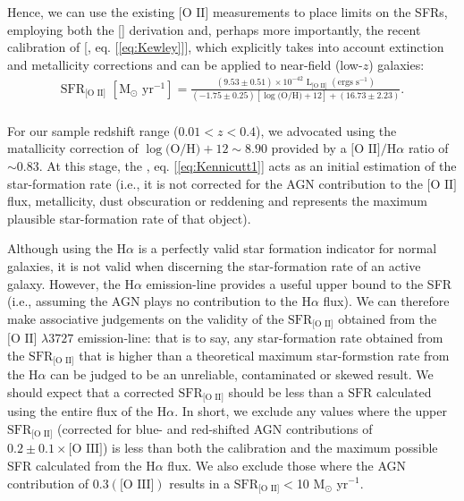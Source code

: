 Hence, we can use the existing $\text{[O II]}$ measurements to place limits on the SFRs, employing both the [\cite{Kennicutt_1998}] derivation and, perhaps more importantly, the recent calibration of [\cite{Kewley_2004}, eq. [\ref{eq:Kewley}]], which explicitly takes into account extinction and metallicity corrections and can be applied to near-field (low-$z$) galaxies:
\\
\begin{equation}
\begin{align}
\label{eq:Kewley}
{\text{SFR}}_{\text{[O II]}}\,\,[\text{M}_\odot \text{ yr}^{-1}]=\frac{(9.53\pm{0.51})\times10^{-42}\,\,\text{L}_{\text{[O II]}}\,\,(\text{ergs }\text{s}^{-1})}{(-1.75\pm{0.25})[\log{\text{(O/H)}}+12]+(16.73\pm{2.23})}.
\end{align}
\end{equation}
\\
For our sample redshift range (${{0.01}<{z}<{0.4}}$), we advocated using the \cite{Teplitz_2003} matallicity correction of $\log{\text{(O/H)} +12}\sim{8.90}$ provided by a $\text{[O II]/H}\alpha$ ratio of $\sim{0.83}$. At this stage, the \cite{Kennicutt_1998}, eq. [\ref{eq:Kennicutt1}] acts as an initial estimation of the star-formation rate (i.e., it is not corrected for the AGN contribution to the $\text{[O II]}$ flux, metallicity, dust obscuration or reddening and represents the maximum plausible star-formation rate of that object).

Although using the $\text{H}\alpha$ is a perfectly valid star formation indicator for normal galaxies, it is not valid when discerning the star-formation rate of an active galaxy. However, the $\text{H}\alpha$ emission-line provides a useful upper bound to the SFR (i.e., assuming the AGN plays no contribution to the $\text{H}\alpha$ flux). We can therefore make associative judgements on the validity of the $\text{SFR}_{\text{[O II]}}$ obtained from the $\text{[O II] }\lambda3727$ emission-line: that is to say, any star-formation rate obtained from the $\text{SFR}_{\text{[O II]}}$ that is higher than a theoretical maximum star-formstion rate from the $\text{H}\alpha$ can be judged to be an unreliable, contaminated or skewed result. We should expect that a corrected $\text{SFR}_{\text{[O II]}}$ should be less than a $\text{SFR}$ calculated using the entire flux of the $\text{H}\alpha$. In short, we exclude any values where the upper $\text{SFR}_{\text{[O II]}}$ (corrected for blue- and red-shifted AGN contributions of $0.2\pm{0.1}\times\text{[O III]}$) is less than both the \cite{Kennicutt_1998} calibration and the maximum possible SFR calculated from the $\text{H}\alpha$ flux. We also exclude those where the AGN contribution of $0.3(\text{[O III]})$ results in a $\text{SFR}_{\text{[O II]}}{<}$10 M$_\odot$ yr$^{-1}$.

